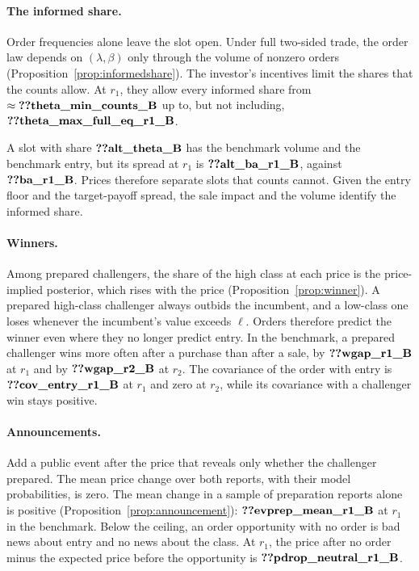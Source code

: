 \paragraph{The informed share.} Order frequencies alone leave the slot open. Under full two-sided trade, the order law
depends on \((\lambda,\beta)\) only through the volume of nonzero orders (Proposition~\ref{prop:informedshare}). The
investor's incentives limit the shares that the counts allow. At \(r_1\), they allow every informed share from
\(\approx\reg{theta_min_counts_B}\) up to, but not including, \(\reg{theta_max_full_eq_r1_B}\).

A slot with share \(\reg{alt_theta_B}\) has the
benchmark volume and the benchmark entry, but its spread at \(r_1\) is \(\reg{alt_ba_r1_B}\), against \(\reg{ba_r1_B}\).
Prices therefore separate slots that counts cannot. Given the entry floor and the target-payoff spread, the sale impact
and the volume identify the informed share.

\paragraph{Winners.} Among prepared challengers, the share of the high class at each price is the price-implied
posterior, which rises with the price (Proposition~\ref{prop:winner}). A prepared high-class challenger always outbids
the incumbent, and a low-class one loses whenever the incumbent's value exceeds \(\ell\). Orders therefore predict the
winner even where they no longer predict entry. In the benchmark, a prepared challenger wins more often
after a purchase than after a sale, by \(\reg{wgap_r1_B}\) at \(r_1\) and by \(\reg{wgap_r2_B}\) at \(r_2\). The
covariance of the order with entry is \(\reg{cov_entry_r1_B}\) at \(r_1\) and zero at \(r_2\), while its covariance with
a challenger win stays positive.

\paragraph{Announcements.} Add a public event after the price that reveals only whether the challenger prepared. The
mean price change over both reports, with their model probabilities, is zero. The mean change in a sample of
preparation reports alone is positive (Proposition~\ref{prop:announcement}): \(\reg{evprep_mean_r1_B}\) at \(r_1\) in
the benchmark. Below the ceiling, an order opportunity with no order is bad news about entry and no news about the
class. At \(r_1\), the price after no order minus the expected price before the opportunity is
\(\reg{pdrop_neutral_r1_B}\).

